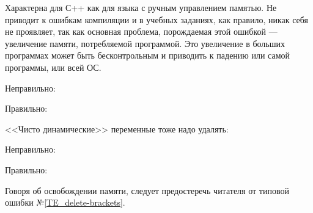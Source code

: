 \begin{typerror}
	\label{TE_memory-leak}

	Характерна для С++ как для языка с ручным управлением памятью.
	Не приводит к ошибкам компиляции и в учебных заданиях, как правило, никак себя не проявляет,
	так как основная проблема, порождаемая этой ошибкой --- увеличение памяти, потребляемой программой.
	Это увеличение в больших программах может быть бесконтрольным и приводить к падению или самой программы, или всей ОС.

	Неправильно:

	Правильно:

	<<Чисто динамические>> переменные тоже надо удалять:

	Неправильно:

	Правильно:

	Говоря об освобождении памяти, следует предостеречь читателя от типовой ошибки №\ref{TE_delete-brackets}.

\end{typerror}
